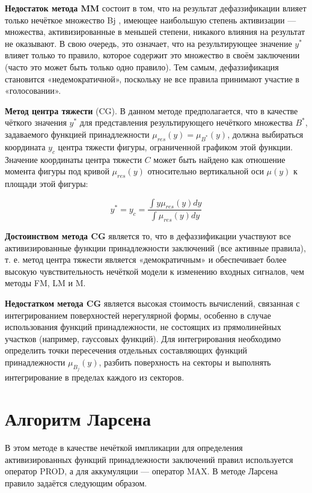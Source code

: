 \textbf{Недостаток метода MM} состоит в том, что на результат дефаззификации
влияет только нечёткое множество Bj , имеющее наибольшую степень активизации — множества, активизированные в меньшей степени, никакого
влияния на результат не оказывают. В свою очередь, это означает, что на результирующее значение $y^*$ влияет только то правило, которое содержит это множество в своём заключении (часто это может быть только
одно правило). Тем самым, дефаззификация становится «недемократичной», поскольку не все правила принимают участие в «голосовании».~\cite{book}

\textbf{Метод центра тяжести} (CG). В данном методе предполагается,
что в качестве чёткого значения $y^*$ для представления результирующего нечёткого множества $B^*$, задаваемого функцией принадлежности
$\mu_{res}(y) = \mu_{B^*}(y)$, должна выбираться координата $y_c$ центра тяжести фигуры, ограниченной графиком этой функции.
Значение координаты центра тяжести $C$ может быть найдено как отношение момента фигуры под кривой $\mu_{res}(y)$ относительно вертикальной оси $\mu(y)$ к площади этой фигуры:~\cite{book}

\begin{equation}
	y^* = y_c = \frac{\int y \mu_{res}(y) dy}{\int\mu_{res}(y) dy}
\end{equation}

\textbf{Достоинством метода CG} является то, что в дефаззификации участвуют все активизированные функции принадлежности заключений (все активные правила), т. е. метод центра
тяжести является «демократичным» и обеспечивает более высокую
чувствительность нечёткой модели к изменению входных сигналов,
чем методы FM, LM и M.~\cite{book}

\textbf{Недостатком метода CG} является высокая стоимость вычислений, связанная с интегрированием поверхностей нерегулярной формы, особенно в случае использования
функций принадлежности, не состоящих из прямолинейных участков (например, гауссовых функций). Для интегрирования необходимо определить точки пересечения отдельных составляющих функций
принадлежности $\mu_{B_j}(y)$, разбить поверхность на секторы и выполнять
интегрирование в пределах каждого из секторов.~\cite{book}

\section{Алгоритм Ларсена}

В этом методе в качестве нечёткой импликации для определения активизированных функций принадлежности заключений правил используется оператор PROD, а для аккумуляции --- оператор MAX. В методе Ларсена правило задаётся следующим образом. \cite{article}

